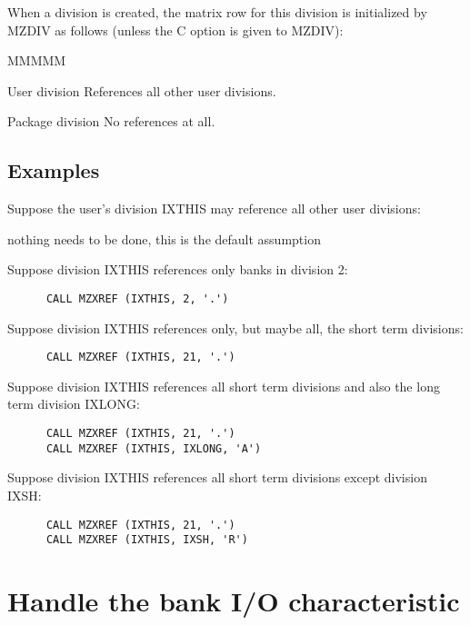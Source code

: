 When a division is created, the matrix row for this division
is initialized by MZDIV
as follows (unless the C option is given to MZDIV):
\begin{DL}{MMMMM}
\item[User division
]References all other user divisions.
\item[Package division
]No references at all.
\end{DL}
\subsection{Examples}
\par
\begin{OL}
\item Suppose the user's division IXTHIS may reference
all other user divisions:
\par
         nothing needs to be done, this is the default assumption
\par
\item Suppose division IXTHIS references
only banks in division 2:
\begin{verbatim}
      CALL MZXREF (IXTHIS, 2, '.')
\end{verbatim}
\item Suppose division IXTHIS references only,
but maybe all, the short term divisions:
\begin{verbatim}
      CALL MZXREF (IXTHIS, 21, '.')
\end{verbatim}
\item Suppose division IXTHIS references all short term
divisions and also the long term division IXLONG:
\begin{verbatim}
      CALL MZXREF (IXTHIS, 21, '.')
      CALL MZXREF (IXTHIS, IXLONG, 'A')
\end{verbatim}
\item Suppose division IXTHIS references all short term
divisions except division IXSH:
\begin{verbatim}
      CALL MZXREF (IXTHIS, 21, '.')
      CALL MZXREF (IXTHIS, IXSH, 'R')
\end{verbatim}
\end{OL}
\section{Handle the bank I/O characteristic}
